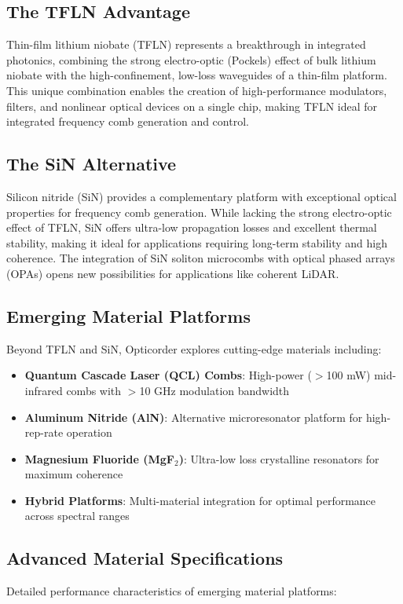 \documentclass[11pt,a4paper]{article}
\begin{document}
\subsection{The TFLN Advantage}
Thin-film lithium niobate (TFLN) represents a breakthrough in integrated photonics, combining the strong electro-optic (Pockels) effect of bulk lithium niobate with the high-confinement, low-loss waveguides of a thin-film platform. This unique combination enables the creation of high-performance modulators, filters, and nonlinear optical devices on a single chip, making TFLN ideal for integrated frequency comb generation and control.

\subsection{The SiN Alternative}
Silicon nitride (SiN) provides a complementary platform with exceptional optical properties for frequency comb generation. While lacking the strong electro-optic effect of TFLN, SiN offers ultra-low propagation losses and excellent thermal stability, making it ideal for applications requiring long-term stability and high coherence. The integration of SiN soliton microcombs with optical phased arrays (OPAs) opens new possibilities for applications like coherent LiDAR.

\subsection{Emerging Material Platforms}
Beyond TFLN and SiN, Opticorder explores cutting-edge materials including:
\begin{itemize}
\item \textbf{Quantum Cascade Laser (QCL) Combs}: High-power ($>$100 mW) mid-infrared combs with $>$10 GHz modulation bandwidth
\item \textbf{Aluminum Nitride (AlN)}: Alternative microresonator platform for high-rep-rate operation
\item \textbf{Magnesium Fluoride (MgF$_2$)}: Ultra-low loss crystalline resonators for maximum coherence
\item \textbf{Hybrid Platforms}: Multi-material integration for optimal performance across spectral ranges
\end{itemize}

\subsection{Advanced Material Specifications}
Detailed performance characteristics of emerging material platforms:
\end{document}
